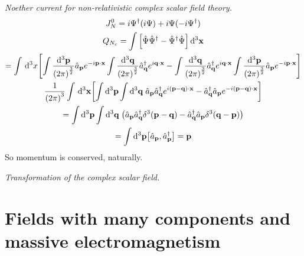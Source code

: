 \documentclass{report}
\begin{document}
\begin{subquests}
	\item \emph{Noether current for non-relativistic complex scalar field theory.}
	\begin{gather*}
		J^0_N = i\Psi^{\dagger}(i\Psi) + i\Psi(-i\Psi^{\dagger}) \\
		Q_{N_c} = \int \bqty{\hat{\Psi}\hat{\Psi}^{\dagger} - \hat{\Psi}^{\dagger}\hat{\Psi}}\,\dd^3{\vb x} \\
		= \int\,\dd^3{x}\bqty{\int \frac{\dd^3{\vb p}}{\pqty{2\pi}^{\frac{3}{2}}}\hat{a}_{\vb p}e^{-i\vb p\cdot \vb x}\int \frac{\dd^3{\vb q}}{\pqty{2\pi}^{\frac{3}{2}}}\hat{a}^{\dagger}_{\vb q}e^{i\vb q\cdot \vb x} - \int \frac{\dd^3{\vb q}}{\pqty{2\pi}^{\frac{3}{2}}}\hat{a}^{\dagger}_{\vb q}e^{i\vb q\cdot \vb x}\int \frac{\dd^3{\vb p}}{\pqty{2\pi}^{\frac{3}{2}}}\hat{a}_{\vb p}e^{-i\vb p\cdot \vb x}} \\
		\frac{1}{\pqty{2\pi}^3}\int\,\dd^3{\vb x}\bqty{\int \dd^3{\vb p}\int \dd^3{\vb q}\;\hat{a}_{\vb p}\hat{a}^{\dagger}_{\vb q}e^{i(\vb p - \vb q)\cdot \vb x} - \hat{a}^{\dagger}_{\vb q}\hat{a}_{\vb p}e^{-i(\vb p - \vb q)\cdot \vb x}} \\
		= \int \dd^3{\vb p}\int \dd^3{\vb q}\;\pqty{\hat{a}_{\vb p}\hat{a}^{\dagger}_{\vb q}\delta^3(\vb p - \vb q) - \hat{a}^{\dagger}_{\vb q}\hat{a}_{\vb p}\delta^3(\vb q - \vb p)} \\
		= \int \dd^3{\vb p}\bqty{\hat{a}_{\vb p},\hat{a}^{\dagger}_{\vb p}} = \vb p
	\end{gather*}
	So momentum is conserved, naturally.

	\item \emph{Transformation of the complex scalar field.}
\end{subquests}


\chapter{Fields with many components and massive electromagnetism}
\end{document}

